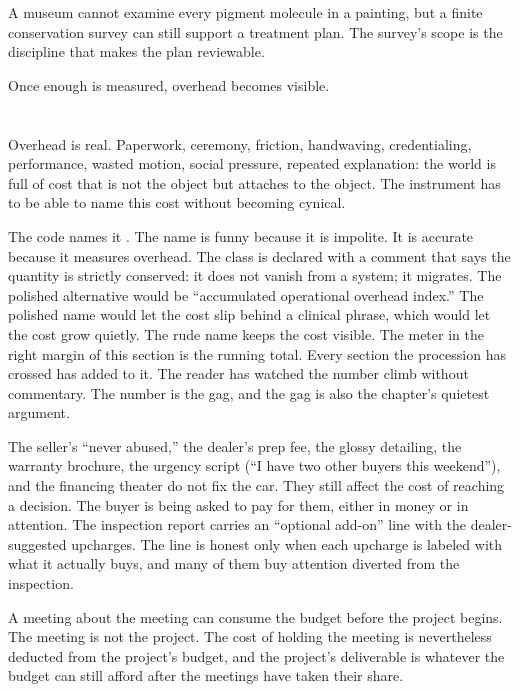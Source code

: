 A museum cannot examine every pigment molecule in a painting, but a
finite conservation survey can still support a treatment plan. The
survey's scope is the discipline that makes the plan reviewable.

Once enough is measured, overhead becomes visible.

\section{}
\label{se:bullshit}

Overhead is real. Paperwork, ceremony, friction, handwaving,
credentialing, performance, wasted motion, social pressure, repeated
explanation: the world is full of cost that is not the object but
attaches to the object. The instrument has to be able to name this
cost without becoming cynical.

The code names it . The name is funny because it is
impolite. It is accurate because it measures overhead. The class is
declared with a comment that says the quantity is strictly conserved:
it does not vanish from a system; it migrates. The polished
alternative would be ``accumulated operational overhead index.'' The
polished name would let the cost slip behind a clinical phrase, which
would let the cost grow quietly. The rude name keeps the cost visible.
The meter in the right margin of this section is the running total.
Every section the procession has crossed has added to it. The reader
has watched the number climb without commentary. The number is the
gag, and the gag is also the chapter's quietest argument.

The seller's ``never abused,'' the dealer's prep fee, the glossy
detailing, the warranty brochure, the urgency script (``I have two
other buyers this weekend''), and the financing theater do not fix the
car. They still affect the cost of reaching a decision. The buyer is
being asked to pay for them, either in money or in attention. The
inspection report carries an ``optional add-on'' line with the
dealer-suggested upcharges. The line is honest only when each upcharge
is labeled with what it actually buys, and many of them buy attention
diverted from the inspection.

A meeting about the meeting can consume the budget before the project
begins. The meeting is not the project. The cost of holding the
meeting is nevertheless deducted from the project's budget, and the
project's deliverable is whatever the budget can still afford after
the meetings have taken their share.

